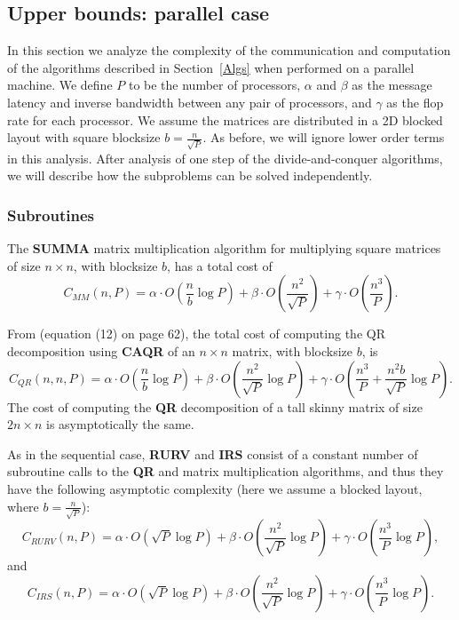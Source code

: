 \documentclass{article}
\def\lt{\left}
\def\rt{\right}
\theoremstyle{definition}
\begin{document}
\subsection{Upper bounds: parallel case} 
\label{UPar}

In this section we analyze the complexity of the communication and computation of the algorithms described in Section~\ref{Algs} when performed on a parallel machine.  We define $P$ to be the number of processors, $\alpha$ and $\beta$ as the message latency and inverse bandwidth between any pair of processors, and $\gamma$ as the flop rate for each processor.  We assume the matrices are distributed in a 2D blocked layout with square blocksize $b=\frac{n}{\sqrt P}$.  As before, we will ignore lower order terms in this analysis.  After analysis of one step of the divide-and-conquer algorithms, we will describe how the subproblems can be solved independently.  

\subsubsection{Subroutines}

The \textbf{SUMMA} matrix multiplication algorithm \cite{SUMMA} for multiplying square matrices of size $n\times n$, with blocksize $b$, has a total cost of
$$C_{MM}(n,P) = \alpha \cdot O\lt( \frac nb \log P \rt) + \beta \cdot O\lt( \frac{n^2}{\sqrt P} \rt) + \gamma \cdot O\lt( \frac{n^3}{P} \rt).$$

From \cite{DGHL08} (equation (12) on page 62), the total cost of computing the QR decomposition using \textbf{CAQR} of an $n\times n$ matrix, with blocksize $b$, is
$$C_{QR}(n,n,P)=\alpha\cdot O\lt(\frac nb \log P \rt)+\beta\cdot O\lt(\frac{n^2}{\sqrt P}\log P\rt)+\gamma\cdot O\lt(\frac{n^3}{P}+\frac{n^2b}{\sqrt P}\log P \rt).$$
The cost of computing the \textbf{QR} decomposition of a tall skinny matrix of size $2n\times n$ is asymptotically the same.

As in the sequential case, \textbf{RURV} and \textbf{IRS} consist of a constant number of subroutine calls to the \textbf{QR} and matrix multiplication algorithms, and thus they have the following asymptotic complexity (here we assume a blocked layout, where $b=\frac{n}{\sqrt  P}$):
$$C_{RURV}(n,P) = \alpha \cdot O\lt( \sqrt P \log P \rt) + \beta \cdot O\lt( \frac{n^2}{\sqrt P} \log P\rt) + \gamma \cdot O\lt( \frac{n^3}{P} \log P  \rt),$$
and
$$C_{IRS}(n,P) = \alpha \cdot O\lt( \sqrt P \log P \rt) + \beta \cdot O\lt( \frac{n^2}{\sqrt P} \log P\rt) + \gamma \cdot O\lt( \frac{n^3}{P} \log P  \rt).$$
\end{document}
